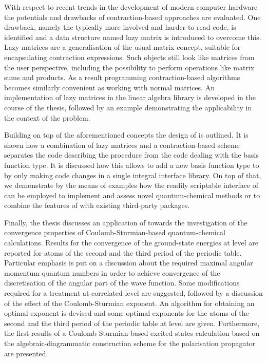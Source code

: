 With respect to recent trends in the development of modern computer hardware
the potentials and drawbacks of contraction-based approaches are evaluated.
One drawback, namely the typically more involved and harder-to-read code,
is identified and a data structure named lazy matrix is introduced
to overcome this.
Lazy matrices are a generalisation of the usual matrix concept,
suitable for encapsulating contraction expressions.
Such objects still look like matrices from the user perspective,
including the possibility to perform operations like matrix sums and products.
As a result programming contraction-based algorithms
becomes similarly convenient as working with normal matrices.
An implementation of lazy matrices in the \lazyten linear algebra library
is developed in the course of the thesis, followed by an example
demonstrating the applicability in the context of the \HF problem.

Building on top of the aforementioned concepts the design of \molsturm is outlined.
It is shown how a combination of lazy matrices and a contraction-based \SCF scheme
separates the code describing the \SCF procedure
from the code dealing with the basis function type.
It is discussed how this allows to add a new basis function type
to \molsturm by only making code changes in a single integral interface library.
On top of that, we demonstrate by the means of examples
how the readily scriptable interface of \molsturm
can be employed to implement and assess novel quantum-chemical methods
or to combine the features of \molsturm with existing third-party packages.

Finally, the thesis discusses an application of \molsturm
towards the investigation of the convergence properties
of Coulomb-Sturmian-based quantum-chemical calculations.
Results for the convergence
of the ground-state energies at \HF level
are reported for atoms of the second and the third period
of the periodic table.
Particular emphasis is put on a discussion about the required
maximal angular momentum quantum numbers
in order to achieve convergence
of the discretisation of the angular part of the wave function.
Some modifications required for a treatment at correlated level are suggested,
followed by a discussion of the effect of the Coulomb-Sturmian exponent.
An algorithm for obtaining an optimal exponent is devised
and some optimal exponents for the atoms of the
second and the third period of the periodic table at \HF level are given.
Furthermore, the first results of a Coulomb-Sturmian-based excited
states calculation based on the algebraic-diagrammatic construction
scheme for the polarisation propagator are presented.


